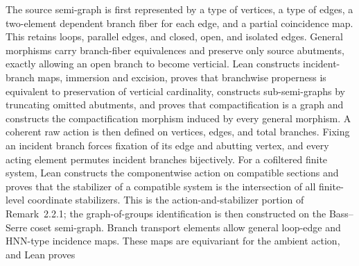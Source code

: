 \begin{definition}
  \leanok
  The source semi-graph is first represented by a type of vertices, a type of
  edges, a two-element dependent branch fiber for each edge, and a partial
  coincidence map.  This retains loops, parallel edges, and closed, open, and
  isolated edges.  General morphisms carry branch-fiber equivalences and
  preserve only source abutments, exactly allowing an open branch to become
  verticial.  Lean constructs incident-branch maps, immersion and excision,
  proves that branchwise properness is equivalent to preservation of verticial
  cardinality, constructs sub-semi-graphs by truncating omitted abutments, and
  proves that compactification is a graph and constructs the compactification
  morphism induced by every general morphism.
  A coherent raw action is then defined on vertices, edges, and total branches.
  Fixing an incident branch forces fixation of its edge and abutting vertex,
  and every acting element permutes incident branches bijectively.  For a
  cofiltered finite system, Lean constructs the componentwise action on
  compatible sections and proves that the stabilizer of a compatible system is
  the intersection of all finite-level coordinate stabilizers.  This is the
  action-and-stabilizer portion of Remark~2.2.1; the graph-of-groups
  identification is then constructed on the Bass--Serre coset semi-graph.
  Branch transport elements allow general loop-edge and HNN-type incidence
  maps.  These maps are equivariant for the ambient action, and Lean proves

\end{definition}
